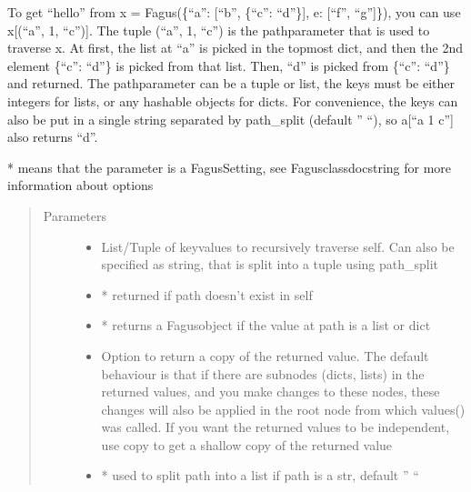 \documentclass[a4paper,10pt,english]{sphinxmanual}
\begin{document}
\begin{fulllineitems}
\begin{fulllineitems}
\sphinxAtStartPar
To get “hello” from x = Fagus(\{“a”: {[}“b”, \{“c”: “d”\}{]}, e: {[}“f”, “g”{]}\}), you can use x{[}(“a”, 1, “c”){]}. The tuple
(“a”, 1, “c”) is the path\sphinxhyphen{}parameter that is used to traverse x. At first, the list at “a” is picked in the
top\sphinxhyphen{}most dict, and then the 2nd element \{“c”: “d”\} is picked from that list. Then, “d” is picked from \{“c”: “d”\}
and returned. The path\sphinxhyphen{}parameter can be a tuple or list, the keys must be either integers for lists, or any
hashable objects for dicts. For convenience, the keys can also be put in a single string separated by
path\_split (default ” “), so a{[}“a 1 c”{]} also returns “d”.

\sphinxAtStartPar
* means that the parameter is a Fagus\sphinxhyphen{}Setting, see Fagus\sphinxhyphen{}class\sphinxhyphen{}docstring for more information about options
\begin{quote}\begin{description}
\item[{Parameters}] \leavevmode\begin{itemize}
\item {}
\sphinxAtStartPar
{} \textendash{} List/Tuple of key\sphinxhyphen{}values to recursively traverse self. Can also be specified as string, that is split
into a tuple using path\_split

\item {}
\sphinxAtStartPar
{} \textendash{} * returned if path doesn’t exist in self

\item {}
\sphinxAtStartPar
{} \textendash{} * returns a Fagus\sphinxhyphen{}object if the value at path is a list or dict

\item {}
\sphinxAtStartPar
{} \textendash{} Option to return a copy of the returned value. The default behaviour is that if there are subnodes
(dicts, lists) in the returned values, and you make changes to these nodes, these changes will also be
applied in the root node from which values() was called. If you want the returned values to be
independent, use copy to get a shallow copy of the returned value

\item {}
\sphinxAtStartPar
{} \textendash{} * used to split path into a list if path is a str, default ” “


\end{itemize}
\end{description}
\end{quote}
\end{fulllineitems}
\end{fulllineitems}
\end{document}
